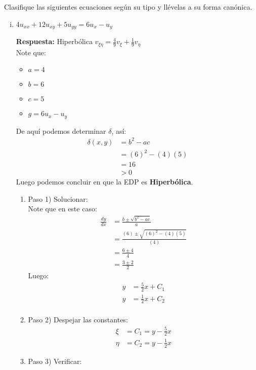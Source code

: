 \begin{homeworkProblem}
Clasifique las siguientes ecuaciones según su tipo y llévelas a su forma canónica.
\begin{enumerate}[(i)]
    \item $4u_{xx}+12u_{xy}+5u_{yy}=6u_{x}-u_{y}$ 
\begin{solucion}
    \textbf{Respuesta:} Hiperbólica $v_{\xi\eta}=\frac{4}{9}v_{\xi}+\frac{1}{9}v_{\eta}$\\
    Note que:
    \begin{itemize}
        \item $a=4$
        \item $b=6$
        \item $c=5$
        \item $g=6u_{x}-u_{y}$
    \end{itemize}
    De aquí podemos determinar $\delta$, así:
    \begin{align*}
        \delta(x,y)&=b^2-ac\\
        &=(6)^2-(4)(5)\\
        &=16\\
        &>0
    \end{align*}
    Luego podemos concluir en que la EDP es \textbf{Hiperbólica}.
    \begin{enumerate}
        \item Paso 1) Solucionar:\\
        Note que en este caso:
        \begin{align*}
            \frac{dy}{dx}&=\frac{b \pm \sqrt{b^{2}-ac}}{a}\\
            &=\frac{(6) \pm \sqrt{(6)^{2}-(4)(5)}}{(4)}\\
            &=\frac{6\pm 4}{4}\\
            &=\frac{3 \pm 2}{2}
        \end{align*}
        Luego:
        \begin{align*}
            y&=\frac{5}{2}x+C_1\\
            y&=\frac{1}{2}x+C_2\\
        \end{align*}
        \item Paso 2) Despejar las constantes:\\
        \begin{align*}
            \xi&=C_1=y-\frac{5}{2}x\\
            \eta&=C_2=y-\frac{1}{2}x
        \end{align*}
        \item Paso 3) Verificar:\\

\end{enumerate}
\end{solucion}
\end{enumerate}
\end{homeworkProblem}
